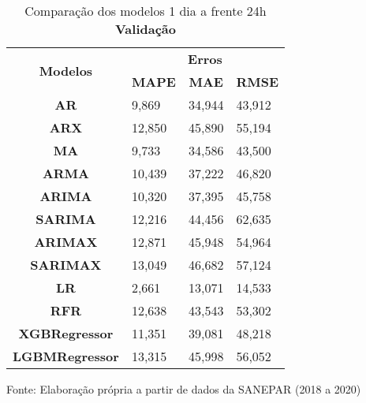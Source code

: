 \begin{table}[H]
	\centering
	\caption{Comparação dos modelos 1 dia a frente 24h \textbf{Validação} }\label{tb:1-24vld}
	\begin{tabular}{@{}clll@{}}
		\toprule
		\multirow{2}{*}{\textbf{Modelos}} & \multicolumn{3}{c}{\textbf{Erros}}                                                                       \\ \cmidrule(l){2-4} 
		& \multicolumn{1}{c}{\textbf{MAPE}} & \multicolumn{1}{c}{\textbf{MAE}} & \multicolumn{1}{c}{\textbf{RMSE}} \\ \hline
\textbf{AR}                       & 9,869                             & 34,944                           & 43,912                            \\
\textbf{ARX}                      & 12,850                            & 45,890                           & 55,194                            \\
\textbf{MA}                       & 9,733                             & 34,586                           & 43,500                            \\
\textbf{ARMA}                     & 10,439                            & 37,222                           & 46,820                            \\
\textbf{ARIMA}                    & 10,320                            & 37,395                           & 45,758                            \\
\textbf{SARIMA}                   & 12,216                            & 44,456                           & 62,635                            \\
\textbf{ARIMAX}                   & 12,871                            & 45,948                           & 54,964                            \\
\textbf{SARIMAX}                  & 13,049                            & 46,682                           & 57,124                            \\
\textbf{LR}        & 2,661                             & 13,071                           & 14,533                            \\
\textbf{RFR}  & 12,638                            & 43,543                           & 53,302                            \\
\textbf{XGBRegressor}             & 11,351                            & 39,081                           & 48,218                            \\
\textbf{LGBMRegressor}            & 13,315                            & 45,998                           & 56,052                            \\ \bottomrule
	\end{tabular}

Fonte: Elaboração própria a partir de dados da SANEPAR (2018 a 2020)
\end{table}

